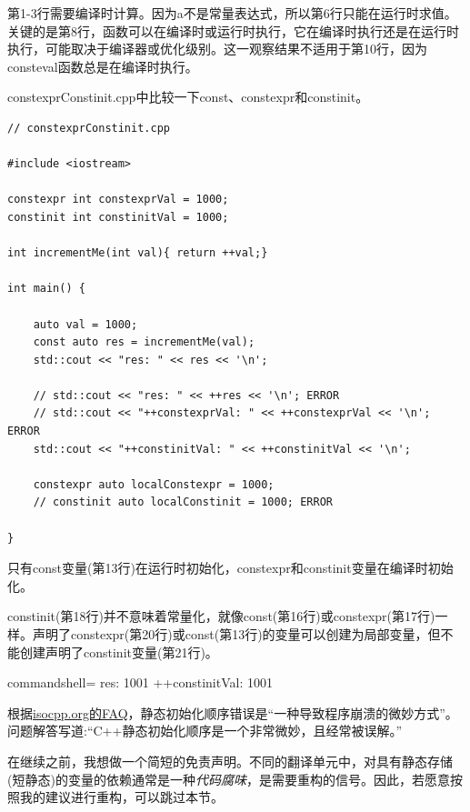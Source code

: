 第1-3行需要编译时计算。因为a不是常量表达式，所以第6行只能在运行时求值。关键的是第8行，函数可以在编译时或运行时执行，它在编译时执行还是在运行时执行，可能取决于编译器或优化级别。这一观察结果不适用于第10行，因为consteval函数总是在编译时执行。


constexprConstinit.cpp中比较一下const、constexpr和constinit。

\begin{lstlisting}[style=styleCXX]
// constexprConstinit.cpp

#include <iostream>

constexpr int constexprVal = 1000;
constinit int constinitVal = 1000;

int incrementMe(int val){ return ++val;}

int main() {
	
	auto val = 1000;
	const auto res = incrementMe(val);
	std::cout << "res: " << res << '\n';
	
	// std::cout << "res: " << ++res << '\n'; ERROR
	// std::cout << "++constexprVal: " << ++constexprVal << '\n'; ERROR
	std::cout << "++constinitVal: " << ++constinitVal << '\n';
	
	constexpr auto localConstexpr = 1000;
	// constinit auto localConstinit = 1000; ERROR

}
\end{lstlisting}

只有const变量(第13行)在运行时初始化，constexpr和constinit变量在编译时初始化。

constinit(第18行)并不意味着常量化，就像const(第16行)或constexpr(第17行)一样。声明了constexpr(第20行)或const(第13行)的变量可以创建为局部变量，但不能创建声明了constinit变量(第21行)。

\begin{tcblisting}{commandshell={}}
res: 1001
++constinitVal: 1001
\end{tcblisting}


根据\href{https://isocpp.org/wiki/faq/ctors#static-init-order}{isocpp.org的FAQ}，静态初始化顺序错误是“一种导致程序崩溃的微妙方式”。问题解答写道:“C++静态初始化顺序是一个非常微妙，且经常被误解。”

在继续之前，我想做一个简短的免责声明。不同的翻译单元中，对具有静态存储(短静态)的变量的依赖通常是一种\textit{代码腐味}，是需要重构的信号。因此，若愿意按照我的建议进行重构，可以跳过本节。

